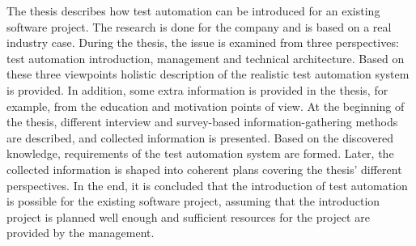 The thesis describes how test automation can be introduced for an existing software project. The research is done for the company and is based on a real industry case. During the thesis, the issue is examined from three perspectives: test automation introduction, management and technical architecture. Based on these three viewpoints holistic description of the realistic test automation system is provided. In addition, some extra information is provided in the thesis, for example, from the education and motivation points of view. At the beginning of the thesis, different interview and survey-based information-gathering methods are described, and collected information is presented. Based on the discovered knowledge, requirements of the test automation system are formed. Later, the collected information is shaped into coherent plans covering the thesis' different perspectives. In the end, it is concluded that the introduction of test automation is possible for the existing software project, assuming that the introduction project is planned well enough and sufficient resources for the project are provided by the management.